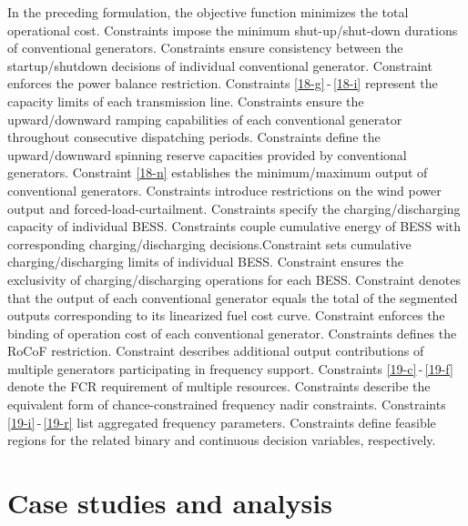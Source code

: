 \documentclass[lettersize,journal]{IEEEtran}
\begin{document}
In the preceding formulation, the objective function  minimizes the total operational cost.
Constraints  impose the minimum shut-up/shut-down durations of conventional generators.
Constraints  ensure consistency between the startup/shutdown decisions of individual conventional generator.
Constraint  enforces the power balance restriction.
Constraints \eqref{18-g}\,-\,\eqref{18-i} represent the capacity limits of each transmission line.
Constraints  ensure the upward/downward ramping capabilities of each conventional generator throughout consecutive dispatching periods.
Constraints  define the upward/downward spinning reserve capacities provided by conventional generators.
Constraint \eqref{18-n} establishes the minimum/maximum output of conventional generators.
Constraints  introduce restrictions on the wind power output and forced-load-curtailment.
Constraints  specify the charging/discharging capacity of individual BESS.
Constraints  couple cumulative energy of BESS with corresponding charging/discharging decisions.Constraint  sets cumulative charging/discharging limits of individual BESS.
Constraint  ensures the exclusivity of charging/discharging operations for each BESS.
Constraint  denotes that the output of each conventional generator equals the total of the segmented outputs corresponding to its linearized fuel cost curve.
Constraint  enforces the binding of operation cost of each conventional generator.
Constraints  defines the RoCoF restriction.
Constraint  describes additional output contributions of multiple generators participating in frequency support.
Constraints \eqref{19-c}\,-\,\eqref{19-f} denote the FCR requirement of multiple resources.
Constraints  describe the equivalent form of chance-constrained frequency nadir constraints.
Constraints \eqref{19-i}\,-\,\eqref{19-r} list aggregated frequency parameters.
Constraints  define feasible regions for the related binary and continuous decision variables, respectively.


\vspace{-0.025in}

\section{Case studies and analysis} 
\end{document}
